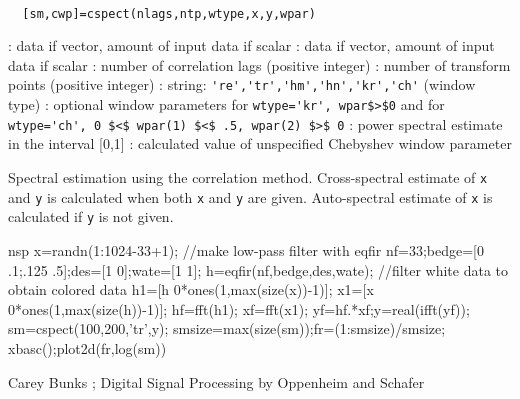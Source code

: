 \begin{mandesc}
   \\ %
\end{mandesc}
\begin{calling_sequence}
\begin{verbatim}
  [sm,cwp]=cspect(nlags,ntp,wtype,x,y,wpar)  
\end{verbatim}
\end{calling_sequence}
\begin{parameters}
  \begin{varlist}
    : data if vector, amount of input data if scalar
    : data if vector, amount of input data if scalar
    : number of correlation lags (positive integer)
    : number of transform points (positive integer)
    : string: \verb!'re','tr','hm','hn','kr','ch'! (window type)
    : optional window parameters for \verb!wtype='kr', wpar$>$0! and for \verb!wtype='ch', 0 $<$ wpar(1) $<$ .5, wpar(2) $>$ 0!
    : power spectral estimate in the interval [0,1]
    : calculated value of unspecified Chebyshev window parameter
  \end{varlist}
\end{parameters}
\begin{mandescription}
  Spectral estimation using the  correlation method.
  Cross-spectral estimate of \verb!x! and \verb!y! is calculated when both
  \verb!x! and \verb!y! are given. Auto-spectral estimate of \verb!x! is calculated
  if \verb!y! is not given.
\end{mandescription}
\begin{examples}
  \begin{mintednsp}{nsp}
    x=randn(1:1024-33+1);
    //make low-pass filter with eqfir
    nf=33;bedge=[0 .1;.125 .5];des=[1 0];wate=[1 1];
    h=eqfir(nf,bedge,des,wate);
    //filter white data to obtain colored data 
    h1=[h 0*ones(1,max(size(x))-1)];
    x1=[x 0*ones(1,max(size(h))-1)];
    hf=fft(h1);   xf=fft(x1); yf=hf.*xf;y=real(ifft(yf));
    sm=cspect(100,200,'tr',y);
    smsize=max(size(sm));fr=(1:smsize)/smsize;
    xbasc();plot2d(fr,log(sm))
  \end{mintednsp}
\end{examples}
\begin{manseealso}
\end{manseealso}
\begin{authors}
  Carey Bunks ;  Digital Signal Processing by Oppenheim and Schafer
\end{authors}
